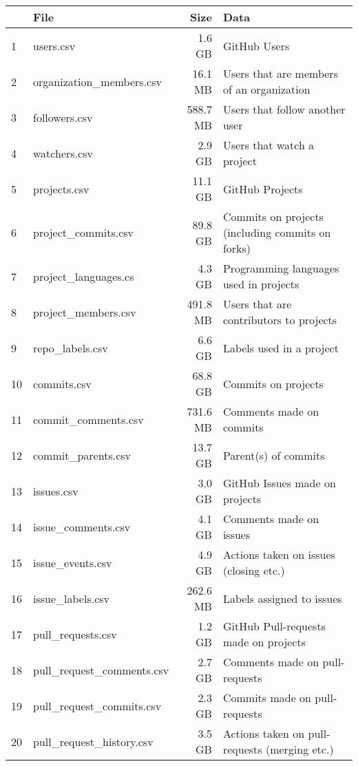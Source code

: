 \vspace{25px}
\begin{table}[htb]
    \centering
    \begin{tabular}{@{}llrl@{}}

        \toprule
             & File & Size & Data \\

        \midrule

           \rowcolor{LightCyan}
            1 & users.csv                   & 1.6 GB   & GitHub Users \\
            2 & organization\_members.csv   & 16.1 MB  & Users that are members of an organization \\
           \rowcolor{LightCyan}
            3 & followers.csv               & 588.7 MB & Users that follow another user \\
           \rowcolor{LightCyan}
            4 & watchers.csv                & 2.9 GB   & Users that watch a project \\
           \rowcolor{LightCyan}
            5 & projects.csv                & 11.1 GB  & GitHub Projects \\
            6 & project\_commits.csv        & 89.8 GB  & Commits on projects (including commits on forks) \\
            7 & project\_languages.cs       & 4.3 GB   & Programming languages used in projects \\
           \rowcolor{LightCyan}
            8 & project\_members.csv        & 491.8 MB & Users that are contributors to projects \\
            9 & repo\_labels.csv            & 6.6 GB   & Labels used in a project \\
           \rowcolor{LightCyan}
           10 & commits.csv                 & 68.8 GB  & Commits on projects \\
           11 & commit\_comments.csv        & 731.6 MB & Comments made on commits \\
           12 & commit\_parents.csv         & 13.7 GB  & Parent(s) of commits \\
           \rowcolor{LightCyan}
           13 & issues.csv                  & 3.0 GB   & GitHub Issues made on projects \\
           14 & issue\_comments.csv         & 4.1 GB   & Comments made on issues \\
           15 & issue\_events.csv           & 4.9 GB   & Actions taken on issues (closing etc.) \\
           16 & issue\_labels.csv           & 262.6 MB & Labels assigned to issues \\
           17 & pull\_requests.csv          & 1.2 GB   & GitHub Pull-requests made on projects \\
           18 & pull\_request\_comments.csv & 2.7 GB   & Comments made on pull-requests \\
           19 & pull\_request\_commits.csv  & 2.3 GB   & Commits made on pull-requests \\
           20 & pull\_request\_history.csv  & 3.5 GB   & Actions taken on pull-requests (merging etc.) \\


\end{tabular}
\end{table}
